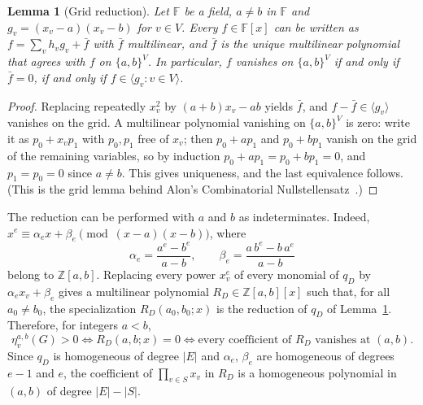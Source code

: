 \documentclass[a4paper,11pt]{article}
\newcommand{\Z}{\mathbb{Z}}
\newcommand{\etav}{\eta_v^{a,b}}
\newtheorem{lem}{Lemma}
\theoremstyle{definition}
\begin{document}
\begin{lem}[Grid reduction] \label{LGRID}
Let $\mathbb{F}$ be a field, $a \neq b$ in $\mathbb{F}$ and $g_v = (x_v - a)(x_v - b)$ for $v \in V$. Every
$f \in \mathbb{F}[x]$ can be written as $f = \sum_{v} h_v g_v + \bar{f}$ with $\bar{f}$ multilinear, and $\bar{f}$ is the unique
multilinear polynomial that agrees with $f$ on $\{a,b\}^V$. In particular, $f$ vanishes on $\{a,b\}^V$ if and only if $\bar{f} = 0$,
if and only if $f \in \langle g_v : v \in V \rangle$.
\end{lem}
\begin{proof}
Replacing repeatedly $x_v^2$ by $(a+b)x_v - ab$ yields $\bar{f}$, and $f - \bar{f} \in \langle g_v \rangle$ vanishes on the grid.
A multilinear polynomial vanishing on $\{a,b\}^V$ is zero: write it as $p_0 + x_v p_1$ with $p_0, p_1$ free of $x_v$; then
$p_0 + a p_1$ and $p_0 + b p_1$ vanish on the grid of the remaining variables, so by induction $p_0 + ap_1 = p_0 + bp_1 = 0$, and
$p_1 = p_0 = 0$ since $a \neq b$. This gives uniqueness, and the last equivalence follows. (This is the grid lemma behind Alon's
Combinatorial Nullstellensatz~\cite{Alon99}.)
\end{proof}

The reduction can be performed with $a$ and $b$ as indeterminates. Indeed, $x^e \equiv \alpha_e x + \beta_e \pmod{(x-a)(x-b)}$, where
$$\alpha_e = \frac{a^e - b^e}{a - b}, \qquad \beta_e = \frac{a\,b^e - b\,a^e}{a - b}$$
belong to $\Z[a,b]$. Replacing every power $x_v^e$ of every monomial of $q_D$ by $\alpha_e x_v + \beta_e$ gives a multilinear
polynomial $R_D \in \Z[a,b][x]$ such that, for all $a_0 \neq b_0$, the specialization $R_D(a_0,b_0;x)$ is the reduction of $q_D$ of
Lemma~\ref{LGRID}. Therefore, for integers $a < b$,
\begin{equation} \label{EOBSTR}
\etav(G) > 0 \iff R_D(a,b;x) = 0 \iff \textrm{every coefficient of } R_D \textrm{ vanishes at } (a,b).
\end{equation}
Since $q_D$ is homogeneous of degree $|E|$ and $\alpha_e$, $\beta_e$ are homogeneous of degrees $e-1$ and $e$, the coefficient of
$\prod_{v \in S} x_v$ in $R_D$ is a homogeneous polynomial in $(a,b)$ of degree $|E| - |S|$.
\end{document}
